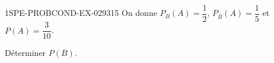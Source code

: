\begin{exercice}{1SPE-PROBCOND-EX-029}{3}{15}
On donne $P_B(A) = \dfrac{1}{2}$, $P_{\overline{B}}(A) = \dfrac{1}{5}$ et $P(A) = \dfrac{3}{10}$.

Déterminer $P(B)$.
\end{exercice}
